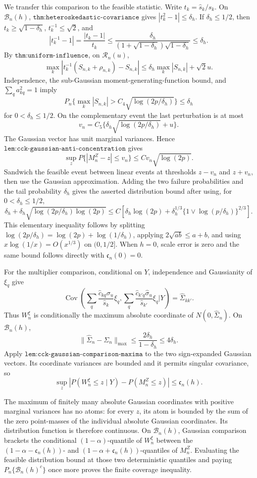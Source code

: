 We transfer this comparison to the feasible statistic.  Write
\(t_k=\widehat s_k/s_k\).  On \(\mathcal B_n(h)\),
\(\texttt{thm:heteroskedastic-covariance}\) gives
\(|t_k^2-1|\le\delta_h\).  If \(\delta_h\le1/2\), then
\(t_k\ge\sqrt{1-\delta_h}\), \(t_k^{-1}\le\sqrt2\), and
\[
 |t_k^{-1}-1|
 =\frac{|t_k-1|}{t_k}
 \le\frac{\delta_h}
 {(1+\sqrt{1-\delta_h})\sqrt{1-\delta_h}}
 \le\delta_h.
\]
By \(\texttt{thm:uniform-influence}\), on \(\mathcal R_n(u)\),
\[
 \max_k\left|t_k^{-1}(S_{n,k}+\rho_{n,k})-S_{n,k}\right|
 \le\delta_h\max_k|S_{n,k}|+\sqrt2u.
\]
Independence, the sub-Gaussian moment-generating-function bound, and
\(\sum_qa_{kq}^2=1\) imply
\[
 P_n\{\max_k|S_{n,k}|>C_4\sqrt{\log(2p/\delta_h)}\}
 \le\delta_h
\]
for \(0<\delta_h\le1/2\).  On the complementary event the last
perturbation is at most
\[
 v_n=C_5\{\delta_h\sqrt{\log(2p/\delta_h)}+u\}.
\]
The Gaussian vector has unit marginal variances.  Hence
\(\texttt{lem:cck-gaussian-anti-concentration}\) gives
\[
 \sup_zP\{|M_n^Z-z|\le v_n\}
 \le Cv_n\sqrt{\log(2p)}.
\]
Sandwich the feasible event between linear events at thresholds
\(z-v_n\) and \(z+v_n\), then use the Gaussian approximation.  Adding
the two failure probabilities and the tail probability \(\delta_h\)
gives the asserted distribution bound after using, for
\(0<\delta_h\le1/2\),
\[
 \delta_h+
 \delta_h\sqrt{\log(2p/\delta_h)\log(2p)}
 \le C\left[\delta_h\log(2p)+
 \delta_h^{1/3}\{1\vee\log(p/\delta_h)\}^{2/3}\right].
\]
This elementary inequality follows by splitting
\(\log(2p/\delta_h)=\log(2p)+\log(1/\delta_h)\), applying
\(2\sqrt{ab}\le a+b\), and using
\(x\log(1/x)=O(x^{1/3})\) on \((0,1/2]\).  When \(h=0\), scale error
is zero and the same bound follows directly with
\(\mathfrak c_n(0)=0\).

For the multiplier comparison, conditional on \(Y\), independence and
Gaussianity of \(\xi_q\) give
\[
 \operatorname{Cov}\!\left(
 \sum_q\frac{\widehat c_{kq}\widehat\sigma_u}{\widehat s_k}\xi_q,
 \sum_q\frac{\widehat c_{k'q}\widehat\sigma_u}{\widehat s_{k'}}\xi_q
 \mathrel{\Big|}Y\right)=\widehat\Sigma_{kk'}.
\]
Thus \(W_n^\xi\) is conditionally the maximum absolute coordinate of
\(N(0,\widehat\Sigma_n)\).  On \(\mathcal B_n(h)\),
\[
 \|\widehat\Sigma_n-\Sigma_n\|_{\max}
 \le\frac{2\delta_h}{1-\delta_h}\le4\delta_h.
\]
Apply \(\texttt{lem:cck-gaussian-comparison-maxima}\) to the two
sign-expanded Gaussian vectors.  Its coordinate variances are bounded
and it permits singular covariance, so
\[
 \sup_z|P(W_n^\xi\le z\mid Y)-P(M_n^Z\le z)|
 \le\mathfrak c_n(h).
\]

The maximum of finitely many absolute Gaussian coordinates with positive
marginal variances has no atoms: for every \(z\), its atom is bounded by
the sum of the zero point-masses of the individual absolute Gaussian
coordinates.  Its distribution function is therefore continuous.  On
\(\mathcal B_n(h)\), Gaussian comparison brackets the conditional
\((1-\alpha)\)-quantile of \(W_n^\xi\) between the
\((1-\alpha-\mathfrak c_n(h))\)- and
\((1-\alpha+\mathfrak c_n(h))\)-quantiles of \(M_n^Z\).  Evaluating the
feasible distribution bound at those two deterministic quantiles and
paying \(P_n\{\mathcal B_n(h)^c\}\) once more proves the finite coverage
inequality.

